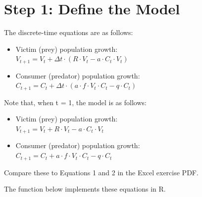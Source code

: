 \documentclass[
  a4paper]{book}
\begin{document}
\section{Step 1: Define the Model}\label{step-1-define-the-model}

The discrete-time equations are as follows:

\begin{itemize}
\item
  Victim (prey) population growth:\\
  \(V_{t+1} = V_t + \Delta t \cdot (R \cdot V_t - a \cdot C_t \cdot V_t)\)
\item
  Consumer (predator) population growth:\\
  \(C_{t+1} = C_t + \Delta t \cdot (a \cdot f \cdot V_t \cdot C_t - q \cdot C_t)\)
\end{itemize}

Note that, when \Delta t = 1, the model is as follows:

\begin{itemize}
\item
  Victim (prey) population growth:\\
  \(V_{t+1} = V_t + R \cdot V_t - a \cdot C_t \cdot V_t\)
\item
  Consumer (predator) population growth:\\
  \(C_{t+1} = C_t + a \cdot f \cdot V_t \cdot C_t - q \cdot C_t\)
\end{itemize}

Compare these to Equations 1 and 2 in the Excel exercise PDF.

The function below implements these equations in R.
\end{document}
